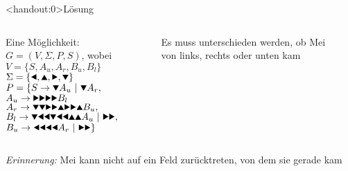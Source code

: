 {
\begin{frame}<handout:0>{Lösung}
    \begin{columns}
        \begin{alertblock}{Eine Möglichkeit:}
            $G = (V, \Sigma, P, S)$, wobei \\
            $V = \{S, A_u, A_r, B_u, B_l\}$ \\
            $\Sigma = \{\text{\Rewind}, \text{\MoveUp}, \text{\Forward}, \text{\MoveDown}\}$ \\
            $P = \{S \rightarrow \text\MoveDown A_u \ |\ \text\MoveDown A_r,$\\
            \qquad\; $A_u \rightarrow \text{\Forward\Forward\Forward\Forward} B_l$\\
            \qquad\; $A_r \rightarrow \text{\MoveDown\MoveDown\Forward\Forward\MoveUp\Forward\Forward\MoveUp} B_u,$\\
            \qquad\; $B_l \rightarrow \text{\MoveDown\Rewind\Rewind\MoveDown\Rewind\Rewind\MoveUp\MoveUp} A_u \ |\ \text{\Forward\Forward},$\\
            \qquad\; $B_u \rightarrow \text{\Rewind\Rewind\Rewind\Rewind} A_r \ |\ \text{\Forward\Forward}\}$
        \end{alertblock}
        \begin{figure}
            \centering
            \def\labyrinthVariant{DecisionPoints}
            \def\labyrinthSize{0.9\textwidth}
            
            \caption{Es muss unterschieden werden, ob Mei von links, rechts oder unten kam}

        \end{figure}
    \end{columns}
    \small\emph{Erinnerung:} Mei kann nicht auf ein Feld zurücktreten, von dem sie gerade kam
\end{frame}
}

